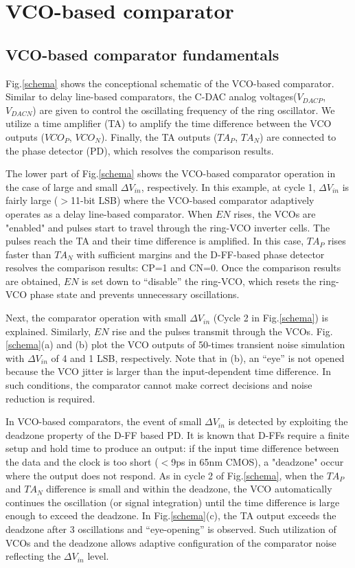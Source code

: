 \documentclass[journal]{IEEEtran}
\begin{document}
\section{VCO-based comparator}
\subsection{VCO-based comparator fundamentals}
Fig.\ref{schema} shows the conceptional schematic of the VCO-based comparator. Similar to delay line-based comparators\cite{agnes20089}, the C-DAC analog voltages($V_{DACP}$, $V_{DACN}$) are given to control the oscillating frequency of the ring oscillator. We utilize a time amplifier (TA)\cite{lee20089} to amplify the time difference between the VCO outputs ($VCO_P$, $VCO_N$). Finally, the TA outputs ($TA_P$, $TA_N$) are connected to the phase detector (PD), which resolves the comparison results.

The lower part of Fig.\ref{schema} shows the VCO-based comparator operation in the case of large and small $\Delta V_{in}$, respectively. In this example, at cycle 1, $\Delta V_{in}$ is fairly large ($>$11-bit LSB) where the VCO-based comparator adaptively operates as a delay line-based comparator. When $EN$ rises, the VCOs are "enabled" and pulses start to travel through the ring-VCO inverter cells. The pulses reach the TA and their time difference is amplified. In this case, $TA_P$ rises faster than $TA_N$ with sufficient margins and the D-FF-based phase detector resolves the comparison results: CP=1 and CN=0. Once the comparison results are obtained, $EN$ is set down to “disable” the ring-VCO, which resets the ring-VCO phase state and prevents unnecessary oscillations.

Next, the comparator operation with small $\Delta V_{in}$ (Cycle 2 in Fig.\ref{schema}) is explained. Similarly, $EN$ rise and the pulses transmit through the VCOs. Fig.\ref{schema}(a) and (b) plot the VCO outputs of 50-times transient noise simulation with $\Delta V_{in}$ of 4 and 1 LSB, respectively. Note that in (b), an “eye” is not opened because the VCO jitter is larger than the input-dependent time difference. In such conditions, the comparator cannot make correct decisions and noise reduction is required.

In VCO-based comparators, the event of small $\Delta V_{in}$ is detected by exploiting the deadzone property of the D-FF based PD. It is known that D-FFs require a finite setup and hold time to produce an output: if the input time difference between the data and the clock is too short ($<$9ps in 65nm CMOS), a "deadzone" occur where the output does not respond.
As in cycle 2 of Fig.\ref{schema}, when the $TA_P$ and $TA_N$ difference is small and within the deadzone, the VCO automatically continues the oscillation (or signal integration) until the time difference is large enough to exceed the deadzone. In Fig.\ref{schema}(c), the TA output exceeds the deadzone after 3 oscillations and “eye-opening” is observed. Such utilization of VCOs and the deadzone allows adaptive configuration of the comparator noise reflecting the $\Delta V_{in}$ level.
\end{document}
